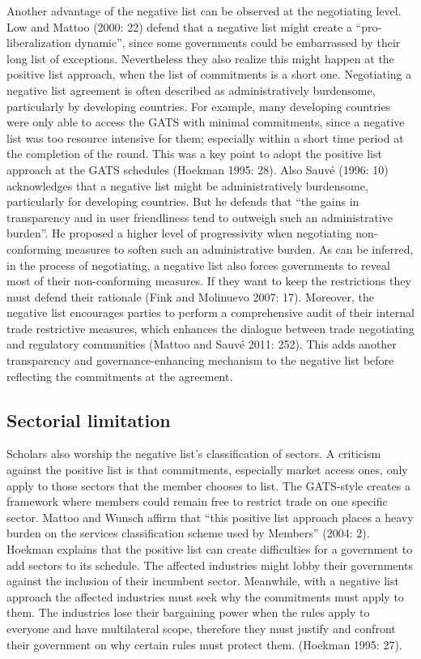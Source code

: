 \documentclass{article}
\begin{document}
Another advantage of the negative list can be observed at the negotiating level. Low and Mattoo (2000: 22) defend that a negative list might create a “pro-liberalization dynamic”, since some governments could be embarrassed by their long list of exceptions. Nevertheless they also realize this might happen at the positive list approach, when the list of commitments is a short one. Negotiating a negative list agreement is often described as administratively burdensome, particularly by developing countries. For example, many developing countries were only able to access the GATS with minimal commitments, since a negative list was too resource intensive for them; especially within a short time period at the completion of the round. This was a key point to adopt the positive list approach at the GATS schedules (Hoekman 1995: 28). Also Sauvé (1996: 10) acknowledges that a negative list might be administratively burdensome, particularly for developing countries. But he defends that “the gains in transparency and in user friendliness tend to outweigh such an administrative burden”. He proposed a higher level of progressivity when negotiating non-conforming measures to soften such an administrative burden. As can be inferred, in the process of negotiating, a negative list also forces governments to reveal most of their non-conforming measures. If they want to keep the restrictions they must defend their rationale (Fink and Molinuevo 2007: 17). Moreover, the negative list encourages parties to perform a comprehensive audit of their internal trade restrictive measures, which enhances the dialogue between trade negotiating and regulatory communities (Mattoo and Sauvé 2011: 252). This adds another transparency and governance-enhancing mechanism to the negative list before reflecting the commitments at the agreement.

\subsection{Sectorial limitation}

Scholars also worship the negative list’s classification of sectors. A criticism against the positive list is that commitments, especially market access ones, only apply to those sectors that the member chooses to list. The GATS-style creates a framework where members could remain free to restrict trade on one specific sector. Mattoo and Wunsch affirm that “this positive list approach places a heavy burden on the services classification scheme used by Members” (2004: 2). Hoekman explains that the positive list can create difficulties for a government to add sectors to its schedule. The affected industries might lobby their governments against the inclusion of their incumbent sector. Meanwhile, with a negative list approach the affected industries must seek why the commitments must apply to them. The industries lose their bargaining power when the rules apply to everyone and have multilateral scope, therefore they must justify and confront their government on why certain rules must protect them. (Hoekman 1995: 27).
\end{document}
